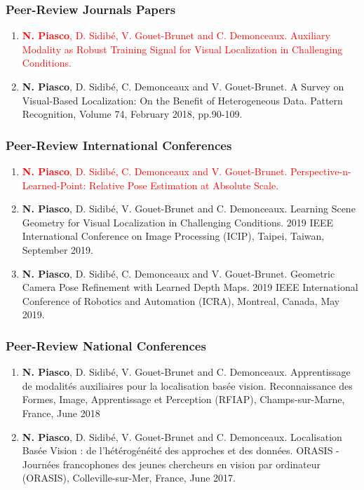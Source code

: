 \begin{publication}

\subsubsection*{Peer-Review Journals Papers}

\begin{enumerate}\scriptsize
	\item \textcolor{red}{\textbf{N. Piasco}, D. Sidib\'e, V. Gouet-Brunet and C. Demonceaux. Auxiliary Modality as Robust Training Signal for
Visual Localization in Challenging Conditions.}
	\item \textbf{N. Piasco}, D. Sidib\'e, C. Demonceaux and V. Gouet-Brunet. A Survey on Visual-Based Localization: On the Benefit of Heterogeneous Data. Pattern Recognition, Volume 74, February 2018, pp.90-109.
\end{enumerate}

\subsubsection*{Peer-Review International Conferences}

\begin{enumerate}\scriptsize
	\item \textcolor{red}{\textbf{N. Piasco}, D. Sidib\'e, C. Demonceaux and V. Gouet-Brunet. Perspective-n-Learned-Point: Relative Pose
Estimation at Absolute Scale.}
	\item \textbf{N. Piasco}, D. Sidib\'e, V. Gouet-Brunet and C. Demonceaux. Learning Scene Geometry for Visual Localization in Challenging Conditions. 2019 IEEE International Conference on Image Processing (ICIP), Taipei, Taiwan, September 2019.
	\item \textbf{N. Piasco}, D. Sidib\'e, C. Demonceaux and V. Gouet-Brunet. Geometric Camera Pose Refinement with Learned Depth Maps. 2019 IEEE International Conference of Robotics and Automation (ICRA), Montreal, Canada, May 2019.
\end{enumerate}

\subsubsection*{Peer-Review National Conferences}

\begin{enumerate}\scriptsize
	\item \textbf{N. Piasco}, D. Sidib\'e, V. Gouet-Brunet and C. Demonceaux. Apprentissage de modalit\'es auxiliaires pour la localisation bas\'ee vision. Reconnaissance des Formes, Image, Apprentissage et Perception (RFIAP), Champs-sur-Marne, France, June 2018
	\item \textbf{N. Piasco}, D. Sidib\'e, V. Gouet-Brunet and C. Demonceaux. Localisation Bas\'ee Vision : de l’h\'et\'erog\'en\'eit\'e des approches et des données. ORASIS - Journ\'ees francophones des jeunes chercheurs en vision par ordinateur (ORASIS), Colleville-sur-Mer, France, June 2017.
\end{enumerate}


\end{publication}

